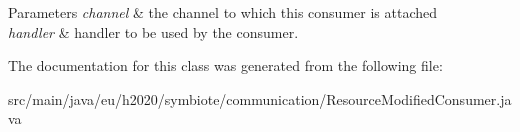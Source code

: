 \begin{DoxyParams}{Parameters}
{\em channel} & the channel to which this consumer is attached \\
\hline
{\em handler} & handler to be used by the consumer. \\
\hline
\end{DoxyParams}


The documentation for this class was generated from the following file\+:\begin{DoxyCompactItemize}
\item 
src/main/java/eu/h2020/symbiote/communication/Resource\+Modified\+Consumer.\+java\end{DoxyCompactItemize}
